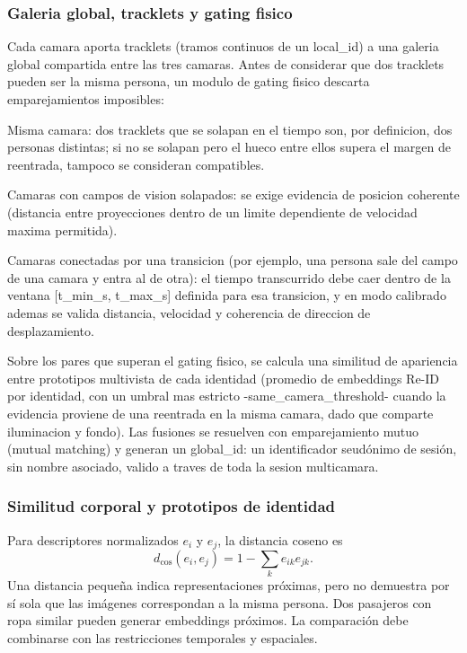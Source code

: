 \documentclass[12pt,letterpaper]{article}
\begin{document}
\subsubsection{Galeria global, tracklets y gating fisico}

Cada camara aporta tracklets (tramos continuos de un local\_id) a una galeria global compartida entre las tres camaras. Antes de considerar que dos tracklets pueden ser la misma persona, un modulo de gating fisico descarta emparejamientos imposibles:


Misma camara: dos tracklets que se solapan en el tiempo son, por definicion, dos personas distintas; si no se solapan pero el hueco entre ellos supera el margen de reentrada, tampoco se consideran compatibles.


Camaras con campos de vision solapados: se exige evidencia de posicion coherente (distancia entre proyecciones dentro de un limite dependiente de velocidad maxima permitida).


Camaras conectadas por una transicion (por ejemplo, una persona sale del campo de una camara y entra al de otra): el tiempo transcurrido debe caer dentro de la ventana [t\_min\_s, t\_max\_s] definida para esa transicion, y en modo calibrado ademas se valida distancia, velocidad y coherencia de direccion de desplazamiento.


Sobre los pares que superan el gating fisico, se calcula una similitud de apariencia entre prototipos multivista de cada identidad (promedio de embeddings Re-ID por identidad, con un umbral mas estricto -same\_camera\_threshold- cuando la evidencia proviene de una reentrada en la misma camara, dado que comparte iluminacion y fondo). Las fusiones se resuelven con emparejamiento mutuo (mutual matching) y generan un global\_id: un identificador seudónimo de sesión, sin nombre asociado, valido a traves de toda la sesion multicamara.


\subsubsection{Similitud corporal y prototipos de identidad}
Para descriptores normalizados $e_i$ y $e_j$, la distancia coseno es
\[
 d_{\mathrm{cos}}(e_i,e_j)=1-\sum_k e_{ik}e_{jk}.
\]
Una distancia pequeña indica representaciones próximas, pero no demuestra por sí sola que las imágenes correspondan a la misma persona. Dos pasajeros con ropa similar pueden generar embeddings próximos. La comparación debe combinarse con las restricciones temporales y espaciales.
\end{document}
